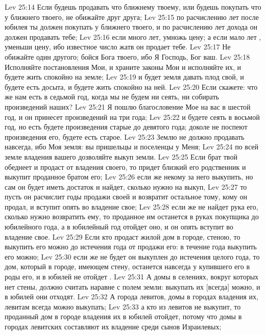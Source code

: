 \vs Lev 25:14 Если будешь продавать что ближнему твоему, или будешь покупать что у ближнего твоего, не обижайте друг друга;
\vs Lev 25:15 по расчислению лет после юбилея ты должен покупать у ближнего твоего, и по расчислению лет дохода он должен продавать тебе;
\vs Lev 25:16 если много  лет, умножь цену; а если мало лет , уменьши цену, ибо известное число  жатв он продает тебе.
\vs Lev 25:17 Не обижайте один другого; бойся Бога твоего, ибо Я Господь, Бог ваш.
\vs Lev 25:18 Исполняйте постановления Мои, и храните законы Мои и исполняйте их, и будете жить спокойно на земле;
\vs Lev 25:19 и будет земля давать плод свой, и будете есть досыта, и будете жить спокойно на ней.
\vs Lev 25:20 Если скажете: что же нам есть в седьмой год, когда мы не будем ни сеять, ни собирать произведений наших?
\vs Lev 25:21 Я пошлю благословение Мое на вас в шестой год, и он принесет произведений на три года;
\vs Lev 25:22 и будете сеять в восьмой год, но есть будете произведения старые до девятого года; доколе не поспеют произведения его, будете есть старое.
\rsbpar\vs Lev 25:23 Землю не должно продавать навсегда, ибо Моя земля: вы пришельцы и поселенцы у Меня;
\vs Lev 25:24 по всей земле владения вашего дозволяйте выкуп земли.
\vs Lev 25:25 Если брат твой обеднеет и продаст от владения своего, то придет близкий его родственник и выкупит проданное братом его;
\vs Lev 25:26 если же некому за него выкупить, но сам он будет иметь достаток и найдет, сколько нужно на выкуп,
\vs Lev 25:27 то пусть он расчислит годы продажи своей и возвратит остальное тому, кому он продал, и вступит опять во владение свое;
\vs Lev 25:28 если же не найдет рука его, сколько нужно возвратить ему, то проданное им останется в руках покупщика до юбилейного года, а в юбилейный год отойдет оно, и он опять вступит во владение свое.
\vs Lev 25:29 Если кто продаст жилой дом в городе,  стеною, то выкупить его можно до истечения года от продажи его: в течение года выкупить его можно;
\vs Lev 25:30 если же не будет он выкуплен до истечения целого года, то дом, который в городе, имеющем стену, останется навсегда у купившего его в роды его, и в юбилей не отойдет .
\vs Lev 25:31 А домы в селениях, вокруг которых нет стены, должно считать наравне с полем земли: выкупать их [всегда] можно, и в юбилей они отходят.
\vs Lev 25:32 А города левитов, домы в городах владения их, левитам всегда можно выкупать;
\vs Lev 25:33 а кто из левитов не выкупит, то проданный дом в городе владения их в юбилей отойдет, потому что домы в городах левитских составляют их владение среди сынов Израилевых;
